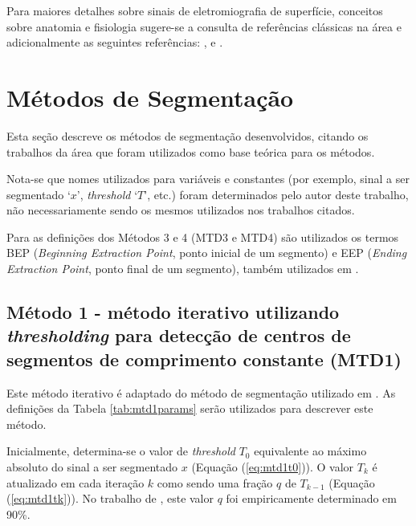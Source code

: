 Para maiores detalhes sobre sinais de eletromiografia de superfície, conceitos sobre anatomia e fisiologia sugere-se a consulta de referências clássicas na área e adicionalmente as seguintes referências: ,  e .

		\section{Métodos de Segmentação}
\label{sec:MTDs}
Esta seção descreve os métodos de segmentação desenvolvidos, citando os trabalhos da área que foram utilizados como base teórica para os métodos.

Nota-se que nomes utilizados para variáveis e constantes (por exemplo, sinal a ser segmentado `$x$', \emph{threshold} `$T$', etc.) foram determinados pelo autor deste trabalho, não necessariamente sendo os mesmos utilizados nos trabalhos citados.

Para as definições dos Métodos 3 e 4 (MTD3 e MTD4) são utilizados os termos BEP (\emph{Beginning Extraction Point}, ponto inicial de um segmento) e EEP (\emph{Ending Extraction Point}, ponto final de um segmento), também utilizados em .
	
				\subsection{Método 1 - método iterativo utilizando \emph{thresholding} para detecção de centros de segmentos de comprimento constante (MTD1)}
Este método iterativo é adaptado do método de segmentação utilizado em . As definições da Tabela \ref{tab:mtd1params} serão utilizados para descrever este método.



Inicialmente, determina-se o valor de \emph{threshold} $T_0$ equivalente ao máximo absoluto do sinal a ser segmentado $x$ (Equação (\ref{eq:mtd1t0})). O valor $T_k$ é atualizado em cada iteração $k$ como sendo uma fração $q$ de $T_{k-1}$ (Equação (\ref{eq:mtd1tk})). No trabalho de , este valor $q$ foi empiricamente determinado em 90\%.

